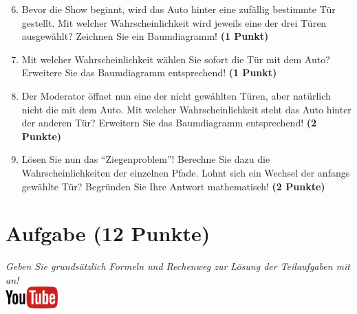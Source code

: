 \documentclass[a4paper, 9pt]{scrartcl}\usepackage[]{graphicx}\usepackage[]{xcolor}
\begin{document}
\begin{enumerate}
  \setcounter{enumi}{5}  
\item Bevor die Show beginnt, wird das Auto hinter eine zuf{\"a}llig bestimmte
  T{\"u}r gestellt. Mit welcher Wahrscheinlichkeit wird jeweils eine der drei
  T{\"u}ren ausgew{\"a}hlt? Zeichnen Sie ein Baumdiagramm! \textbf{(1 Punkt)}
\item Mit welcher Wahrscheinlichkeit w{\"a}hlen Sie sofort die T{\"u}r mit
  dem Auto? Erweitere Sie das Baumdiagramm entsprechend! \textbf{(1
    Punkt)}
\item Der Moderator {\"o}ffnet nun eine der nicht gew{\"a}hlten T{\"u}ren, aber
  nat{\"u}rlich nicht die mit dem Auto. Mit welcher Wahrscheinlichkeit steht
  das Auto hinter der anderen T{\"u}r? Erweitern Sie das Baumdiagramm
  entsprechend! \textbf{(2 Punkte)}
\item L{\"o}sen Sie nun das "`Ziegenproblem"'! Berechne Sie dazu die
  Wahrscheinlichkeiten der einzelnen Pfade. Lohnt sich ein Wechsel der
  anfangs gew{\"a}hlte T{\"u}r? Begr{\"u}nden Sie Ihre Antwort mathematisch!
  \textbf{(2 Punkte)}
\end{enumerate}
 






 
\clearpage

\section{Aufgabe \hfill (12 Punkte)}

\textit{Geben Sie grunds{\"a}tzlich Formeln und Rechenweg zur L{\"o}sung der
  Teilaufgaben mit an!} \\[1Ex]

\hfill\href{https://youtu.be/flRBo1FWQy0}{\includegraphics[width = 2cm]{img/youtube}} %
\hspace{2Ex}
\end{document}
